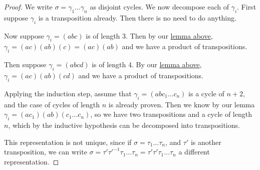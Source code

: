 \begin{proof}
    We write \(\sigma = \gamma_1\hdots\gamma_n\) as disjoint cycles.
    We now decompose each of \(\gamma_i\).
    First suppose \(\gamma_i\) is a transposition already.
    Then there is no need to do anything.

    Now suppose \(\gamma_i = (abc)\) is of length 3.
    Then by our \hyperref[lem:breaking-cycles-sn]{lemma above},
    \(\gamma_i = (ac)(ab)(c) = (ac)(ab)\)
    and we have a product of transpositions.

    Then suppose \(\gamma_i = (abcd)\) is of length 4.
    By our \hyperref[lem:breaking-cycles-sn]{lemma above},
    \(\gamma_i = (ac)(ab)(cd)\)
    and we have a product of transpositions.

    Applying the induction step,
    assume that \(\gamma_i = (a b c_1 \hdots c_n)\) is a cycle of \(n+2\),
    and the case of cycles of length \(n\) is already proven.
    Then we know by our lemma \(\gamma_i = (ac_1)(ab)(c_1 \hdots c_n)\),
    so we have two transpositions and a cycle of length \(n\),
    which by the inductive hypothesis can be decomposed into transpositions.

    This representation is not unique,
    since if \(\sigma = \tau_1\hdots\tau_n\),
    and \(\tau'\) is another transposition,
    we can write \(\sigma = \tau'{\tau'}^{-1}\tau_1\hdots\tau_n
    = \tau'\tau'\tau_1\hdots\tau_n\)
    a different representation.
\end{proof}

